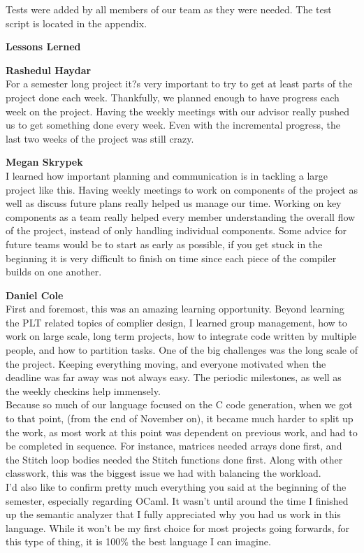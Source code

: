 \documentclass[11pt, oneside]{article}   	%
\newcommand{\tab} {\hspace*{2em}}
\begin{document}
Tests were added by all members of our team as they were needed. The test script is located in the appendix.


\newpage
\LARGE\textbf{Lessons Lerned}\\[2em]
\normalsize

\Large\textbf{Rashedul Haydar}\\[1em]
\normalsize
\tab For a semester long project it?s very important to try to get at least parts of the project done each week. Thankfully, we planned enough to have progress each week on the project. Having the weekly meetings with our advisor really pushed us to get something done every week. Even with the incremental progress, the last two weeks of the project was still crazy. 

\newpage
\Large\textbf{Megan Skrypek}\\[1em]
\normalsize
\tab I learned how important planning and communication is in tackling a large project like this. Having weekly meetings to work on components of the project as well as discuss future plans really helped us manage our time. Working on key components as a team really helped every member understanding the overall flow of the project, instead of only handling individual components. Some advice for future teams would be to start as early as possible, if you get stuck in the beginning it is very difficult to finish on time since each piece of the compiler builds on one another.

\newpage
\Large\textbf{Daniel Cole}\\[1em]
\normalsize
\tab First and foremost, this was an amazing learning opportunity.  Beyond learning the PLT related topics of complier design, I learned group management, how to work on large scale, long term projects, how to integrate code written by multiple people, and how to partition tasks.  One of the big challenges was the long scale of the project.  Keeping everything moving, and everyone motivated when the deadline was far away was not always easy.  The periodic milestones, as well as the weekly checkins help immensely.\\[.5em]
\tab Because so much of our language focused on the C code generation, when we got to that point, (from the end of November on), it became much harder to split up the work, as most work at this point was dependent on previous work, and had to be completed in sequence.  For instance, matrices needed arrays done first, and the Stitch loop bodies needed the Stitch functions done first.  Along with other classwork, this was the biggest issue we had with balancing the workload.\\[.5em]
\tab I'd also like to confirm pretty much everything you said at the beginning of the semester, especially regarding OCaml.  It wasn't until around the time I finished up the semantic analyzer that I fully appreciated why you had us work in this language.  While it won't be my first choice for most projects going forwards, for this type of thing, it is 100\% the best language I can imagine.
\end{document}
